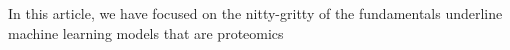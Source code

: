 In this article, we have focused on the nitty-gritty of the fundamentals underline machine learning models that are  proteomics